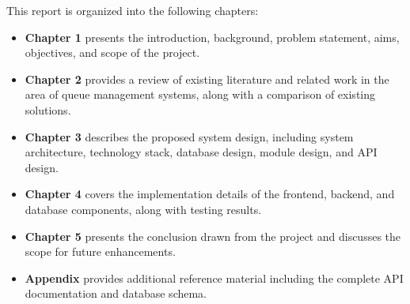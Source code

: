 This report is organized into the following chapters:

\begin{itemize}
    \item \textbf{Chapter 1} presents the introduction, background, problem statement, aims, objectives, and scope of the project.
    \item \textbf{Chapter 2} provides a review of existing literature and related work in the area of queue management systems, along with a comparison of existing solutions.
    \item \textbf{Chapter 3} describes the proposed system design, including system architecture, technology stack, database design, module design, and API design.
    \item \textbf{Chapter 4} covers the implementation details of the frontend, backend, and database components, along with testing results.
    \item \textbf{Chapter 5} presents the conclusion drawn from the project and discusses the scope for future enhancements.
    \item \textbf{Appendix} provides additional reference material including the complete API documentation and database schema.
\end{itemize}
